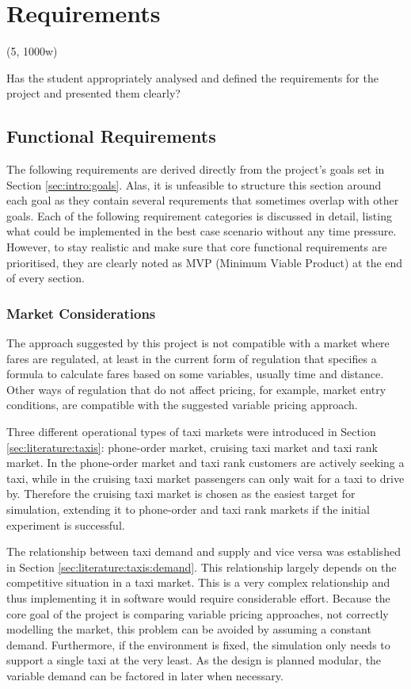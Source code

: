 \newpage
\section{Requirements}
\label{sec:requirements}

(5, 1000w)

Has the student appropriately analysed and defined the requirements for the
project and presented them clearly?


\subsection{Functional Requirements}
\label{sec:requirements:simulation}

The following requirements are derived directly from the project's goals set in
Section \ref{sec:intro:goals}. Alas, it is unfeasible to structure this section
around each goal as they contain several requrements that sometimes overlap
with other goals. Each of the following requirement categories is discussed in
detail, listing what could be implemented in the best case scenario without any
time pressure. However, to stay realistic and make sure that core functional
requirements are prioritised, they are clearly noted as MVP (Minimum Viable
Product) at the end of every section.


\subsubsection{Market Considerations}

The approach suggested by this project is not compatible with a market where
fares are regulated, at least in the current form of regulation that specifies
a formula to calculate fares based on some variables, usually time and
distance. Other ways of regulation that do not affect pricing, for example,
market entry conditions, are compatible with the suggested variable pricing
approach.

Three different operational types of taxi markets were introduced in Section
\ref{sec:literature:taxis}: phone-order market, cruising taxi market and taxi
rank market. In the phone-order market and taxi rank customers are actively
seeking a taxi, while in the cruising taxi market passengers can only wait for
a taxi to drive by. Therefore the cruising taxi market is chosen as the easiest
target for simulation, extending it to phone-order and taxi rank markets if the
initial experiment is successful.

The relationship between taxi demand and supply and vice versa was established
in Section \ref{sec:literature:taxis:demand}. This relationship largely depends
on the competitive situation in a taxi market. This is a very complex
relationship and thus implementing it in software would require considerable
effort. Because the core goal of the project is comparing variable pricing
approaches, not correctly modelling the market, this problem can be avoided by
assuming a constant demand. Furthermore, if the environment is fixed, the
simulation only needs to support a single taxi at the very least. As the design
is planned modular, the variable demand can be factored in later when
necessary.

